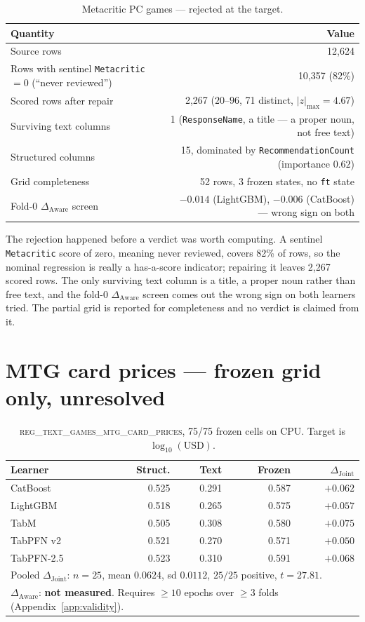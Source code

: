 \documentclass[10pt,letterpaper]{article}
\newcommand{\dj}{\Delta_{\mathrm{Joint}}}
\newcommand{\da}{\Delta_{\mathrm{Aware}}}
\begin{document}
\begin{table}[H]
\centering\small
\caption{Metacritic PC games --- rejected at the target.}
\begin{tabular}{lr}
\toprule
Quantity & Value \\
\midrule
Source rows & 12{,}624 \\
Rows with sentinel \texttt{Metacritic} $= 0$ (``never reviewed'') & 10{,}357 (82\%) \\
Scored rows after repair & 2{,}267 ($20$--$96$, 71 distinct, $|z|_{\max} = 4.67$) \\
Surviving text columns & 1 (\texttt{ResponseName}, a title --- a proper noun, not free text) \\
Structured columns & 15, dominated by \texttt{RecommendationCount} (importance $0.62$) \\
Grid completeness & 52 rows, 3 frozen states, no \texttt{ft} state \\
Fold-0 $\da$ screen & $-0.014$ (LightGBM), $-0.006$ (CatBoost) --- wrong sign on both \\
\bottomrule
\end{tabular}
\end{table}

\noindent The rejection happened before a verdict was worth computing. A sentinel \texttt{Metacritic}
score of zero, meaning never reviewed, covers 82\% of rows, so the nominal regression is really
a has-a-score indicator; repairing it leaves 2{,}267 scored rows. The only surviving text
column is a title, a proper noun rather than free text, and the fold-0 $\da$ screen comes out
the wrong sign on both learners tried. The partial grid is reported for completeness and no
verdict is claimed from it.


\clearpage
\section{MTG card prices --- frozen grid only, unresolved}
\label{app:mtg}

\begin{table}[H]
\centering\small
\caption{\textsc{reg\_text\_games\_mtg\_card\_prices}, 75/75 frozen cells on CPU. Target is
$\log_{10}(\text{USD})$.}
\begin{tabular}{lrrrr}
\toprule
Learner & Struct. & Text & Frozen & $\dj$ \\
\midrule
CatBoost   & 0.525 & 0.291 & 0.587 & $+0.062$ \\
LightGBM   & 0.518 & 0.265 & 0.575 & $+0.057$ \\
TabM       & 0.505 & 0.308 & 0.580 & $+0.075$ \\
TabPFN v2  & 0.521 & 0.270 & 0.571 & $+0.050$ \\
TabPFN-2.5 & 0.523 & 0.310 & 0.591 & $+0.068$ \\
\midrule
\multicolumn{5}{l}{Pooled $\dj$: $n{=}25$, mean $0.0624$, sd $0.0112$, $25/25$ positive, $t = 27.81$.} \\
\multicolumn{5}{l}{$\da$: \textbf{not measured}. Requires $\ge 10$ epochs over $\ge 3$ folds (Appendix~\ref{app:validity}).} \\
\bottomrule
\end{tabular}
\end{table}
\end{document}
